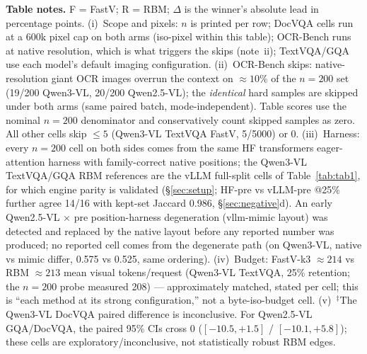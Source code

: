 \documentclass[sigconf,nonacm]{acmart}
\begin{document}
\begin{table}[t]
  \vspace{3pt}
  \footnotesize
  \textbf{Table notes.} F = FastV; R = RBM; $\Delta$ is the winner's absolute
  lead in percentage points. (i)~Scope and pixels: $n$ is printed per row; DocVQA
  cells run at a 600k pixel cap on both arms (iso-pixel within this table);
  OCR-Bench runs at native resolution, which is what triggers the skips
  (note~ii); TextVQA/GQA use each model's default imaging configuration.
  (ii)~OCR-Bench skips: native-resolution giant OCR images overrun the context
  on $\approx 10\%$ of the $n = 200$ set (19/200 Qwen3-VL, 20/200 Qwen2.5-VL);
  the \emph{identical} hard samples are skipped under both arms (same paired
  batch, mode-independent). Table scores use the nominal $n=200$ denominator
  and conservatively count skipped samples as zero. All other cells skip
  $\leq 5$ (Qwen3-VL TextVQA
  FastV, 5/5000) or 0. (iii)~Harness: every $n = 200$ cell on both sides comes
  from the same HF transformers eager-attention harness with family-correct
  native positions; the Qwen3-VL TextVQA/GQA RBM references are the vLLM
  full-split cells of Table~\ref{tab:tab1}, for which engine parity is validated
  (\S\ref{sec:setup}; HF-pre vs vLLM-pre @25\% further agree 14/16 with kept-set
  Jaccard 0.986, \S\ref{sec:negative}d). An early Qwen2.5-VL $\times$ pre
  position-harness degeneration (vllm-mimic layout) was detected and replaced by
  the native layout before any reported number was produced; no reported cell
  comes from the degenerate path (on Qwen3-VL, native vs mimic differ, 0.575 vs
  0.525, same ordering). (iv)~Budget: FastV-k3 $\approx 214$ vs RBM
  $\approx 213$ mean visual tokens/request (Qwen3-VL TextVQA, 25\% retention;
  the $n = 200$ probe measured 208) --- approximately matched, stated per cell;
  this is ``each method at its strong configuration,'' not a byte-iso-budget
  cell. (v)~$^{\ddagger}$The Qwen3-VL DocVQA paired difference is inconclusive.
  For Qwen2.5-VL GQA/DocVQA, the paired 95\% CIs cross 0
  ($[-10.5, +1.5]$ / $[-10.1, +5.8]$); these cells are
  exploratory/inconclusive, not statistically robust RBM edges.
\end{table}

\end{document}
